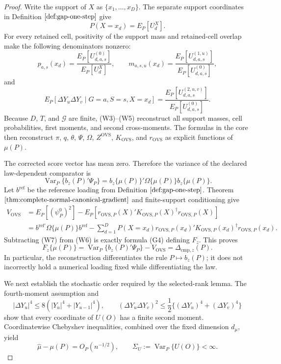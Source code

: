 \documentclass{article}
\begin{document}
\begin{proof}
Write the support of \(X\) as \(\{x_1,\ldots,x_D\}\).  The separate support coordinates in Definition \(\ref{def:gap-one-step}\) give
\[
 P(X=x_d)=E_P[U_d^X].
\tag{W3}
\]
For every retained cell, positivity of the support mass and retained-cell overlap make the following denominators nonzero:
\[
 p_{a,s}(x_d)
 =\frac{E_P[U^{(0)}_{d,a,s}]}{E_P[U_d^X]},
 \qquad
 m_{a,s,u}(x_d)
 =\frac{E_P[U^{(1,u)}_{d,a,s}]}{E_P[U^{(0)}_{d,a,s}]},
\tag{W4}
\]
and
\[
 E_P[\Delta Y_u\Delta Y_v\mid G=a,S=s,X=x_d]
 =\frac{E_P[U^{(2,u,v)}_{d,a,s}]}{E_P[U^{(0)}_{d,a,s}]}.
\tag{W5}
\]
Because \(D\), \(T\), and \(\mathcal G\) are finite, (W3)--(W5) reconstruct all support masses, cell probabilities, first moments, and second cross-moments.  The formulas in the core then reconstruct \(\pi\), \(q\), \(\theta\), \(\Psi\), \(\Omega\), \(Z^{\mathrm{OVS}}\), \(K_{\mathrm{OVS}}\), and \(r_{\mathrm{OVS}}\) as explicit functions of \(\mu(P)\).

The corrected score vector has mean zero.  Therefore the variance of the declared law-dependent comparator is
\[
 \operatorname{Var}_P\{b_z(P)'\Psi_P\}
 =b_z\{\mu(P)\}'\Omega\{\mu(P)\}b_z\{\mu(P)\}.
\tag{W6}
\]
Let \(b^{\mathrm{ref}}\) be the reference loading from Definition \(\ref{def:gap-one-step}\).  Theorem \(\ref{thm:complete-normal-canonical-gradient}\) and finite-support conditioning give
\[
 \begin{aligned}
 V_{\mathrm{OVS}}
 &=E_P[(\psi_P^0)^2]
 -E_P[r_{\mathrm{OVS},P}(X)'K_{\mathrm{OVS},P}(X)^\dagger
 r_{\mathrm{OVS},P}(X)]\\
 &=b^{\mathrm{ref}\prime}\Omega\{\mu(P)\}b^{\mathrm{ref}}
 -\sum_{d=1}^D P(X=x_d)
 r_{\mathrm{OVS},P}(x_d)'K_{\mathrm{OVS},P}(x_d)^\dagger
 r_{\mathrm{OVS},P}(x_d).
 \end{aligned}
\tag{W7}
\]
Subtracting (W7) from (W6) is exactly formula (G4) defining \(F_z\).  This proves
\[
 F_z\{\mu(P)\}
 =\operatorname{Var}_P\{b_z(P)'\Psi_P\}-V_{\mathrm{OVS}}
 =\Delta_{\mathrm{cmp},z}(P).
\tag{W8}
\]
In particular, the reconstruction differentiates the rule \(P\mapsto b_z(P)\); it does not incorrectly hold a numerical loading fixed while differentiating the law.

We next establish the stochastic order required by the selected-rank lemma.  The fourth-moment assumption and
\[
 |\Delta Y_u|^4\le 8(|Y_u|^4+|Y_{u-1}|^4),
 \qquad
 (\Delta Y_u\Delta Y_v)^2
 \le\frac12\{(\Delta Y_u)^4+(\Delta Y_v)^4\}
\tag{W9}
\]
show that every coordinate of \(U(O)\) has a finite second moment.  Coordinatewise Chebyshev inequalities, combined over the fixed dimension \(d_\mu\), yield
\[
 \widehat\mu-\mu(P)=O_P(n^{-1/2}),
 \qquad
 \Sigma_U:=\operatorname{Var}_P\{U(O)\}<\infty.
\tag{W10}
\]


\end{proof}
\end{document}
